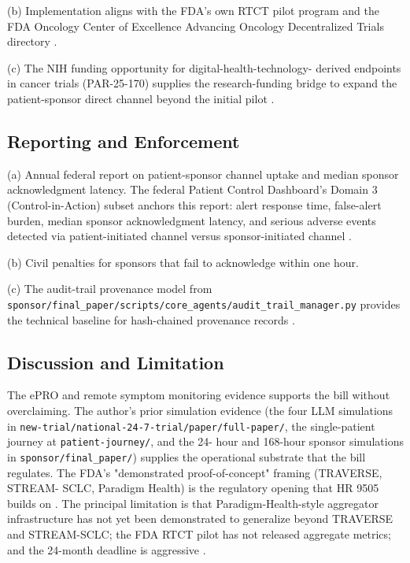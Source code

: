 (b) Implementation aligns with the FDA's own RTCT pilot program and
the FDA Oncology Center of Excellence Advancing Oncology
Decentralized Trials directory
\cite{fda_oce_advancing_oncology_dct_2024}.

(c) The NIH funding opportunity for digital-health-technology-
derived endpoints in cancer trials (PAR-25-170) supplies the
research-funding bridge to expand the patient-sponsor direct
channel beyond the initial pilot
\cite{nih_par25_170_dht_endpoints}.

\subsection{Reporting and Enforcement}

(a) Annual federal report on patient-sponsor channel uptake and
median sponsor acknowledgment latency. The federal Patient Control
Dashboard's Domain 3 (Control-in-Action) subset anchors this
report: alert response time, false-alert burden, median sponsor
acknowledgment latency, and serious adverse events detected via
patient-initiated channel versus sponsor-initiated channel
\cite{rocque2025remote_symptom_monitoring}.

(b) Civil penalties for sponsors that fail to acknowledge within
one hour.

(c) The audit-trail provenance model from
\texttt{sponsor/final\_paper/scripts/core\_agents/audit\_trail\_manager.py}
provides the technical baseline for hash-chained provenance records
\cite{kawchak_2026_19396256}.

\subsection{Discussion and Limitation}

The ePRO and remote symptom monitoring evidence supports the bill
without overclaiming. The author's prior simulation evidence (the
four LLM simulations in
\texttt{new-trial/national-24-7-trial/paper/full-paper/}, the
single-patient journey at \texttt{patient-journey/}, and the 24-
hour and 168-hour sponsor simulations in \texttt{sponsor/final\_paper/})
supplies the operational substrate that the bill regulates. The
FDA's "demonstrated proof-of-concept" framing (TRAVERSE, STREAM-
SCLC, Paradigm Health) is the regulatory opening that HR 9505
builds on \cite{kawchak_2026_19994945, kawchak_2026_19119939,
kawchak_2026_19396256, fda_rtct_press_2026,
fda_dhts_drug_development_2026}. The principal limitation is that
Paradigm-Health-style aggregator infrastructure has not yet been
demonstrated to generalize beyond TRAVERSE and STREAM-SCLC; the
FDA RTCT pilot has not released aggregate metrics; and the 24-month
deadline is aggressive \cite{fda_rtct_press_2026}.

